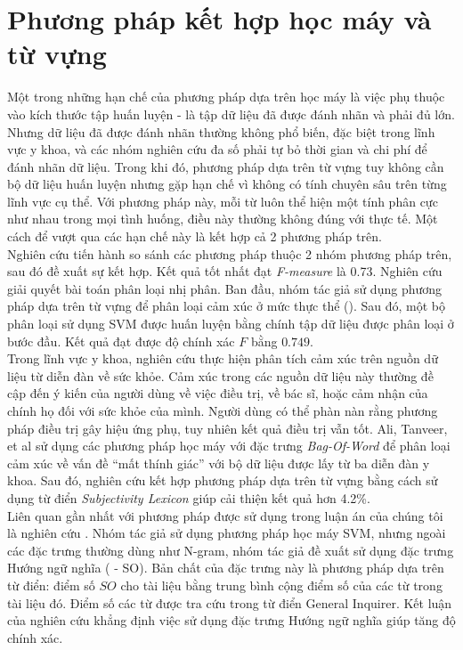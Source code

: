 \section{Phương pháp kết hợp học máy và từ vựng}
Một trong những hạn chế của phương pháp dựa trên học máy là việc phụ thuộc vào kích thước tập huấn luyện - là tập dữ liệu đã được đánh nhãn và phải đủ lớn. Nhưng dữ liệu đã được đánh nhãn thường không phổ biến, đặc biệt trong lĩnh vực y khoa, và các nhóm nghiên cứu đa số phải tự bỏ thời gian và chi phí để đánh nhãn dữ liệu. Trong khi đó, phương pháp dựa trên từ vựng tuy không cần bộ dữ liệu huấn luyện nhưng gặp hạn chế vì không có tính chuyên sâu trên từng lĩnh vực cụ thể. Với phương pháp này, mỗi từ luôn thể hiện một tính phân cực như nhau trong mọi tình huống, điều này thường không đúng với thực tế. Một cách để vượt qua các hạn chế này là kết hợp cả 2 phương pháp trên.\\

Nghiên cứu \cite{gonccalves2013comparing} tiến hành so sánh các phương pháp thuộc 2 nhóm phương pháp trên, sau đó đề xuất sự kết hợp. Kết quả tốt nhất đạt \textit{F-measure} là 0.73. Nghiên cứu \cite{Zhang2015} giải quyết bài toán phân loại nhị phân. Ban đầu, nhóm tác giả sử dụng phương pháp dựa trên từ vựng để phân loại cảm xúc ở mức thực thể (). Sau đó, một bộ phân loại sử dụng SVM được huấn luyện bằng chính tập dữ liệu được phân loại ở bước đầu. Kết quả đạt được độ chính xác $F$ bằng $0.749$.\\

Trong lĩnh vực y khoa, nghiên cứu \cite{ali2013can} thực hiện phân tích cảm xúc trên nguồn dữ liệu từ diễn đàn về sức khỏe. Cảm xúc trong các nguồn dữ liệu này thường đề cập đến ý kiến của người dùng về việc điều trị, về bác sĩ, hoặc cảm nhận của chính họ đối với sức khỏe của mình. Người dùng có thể phàn nàn rằng phương pháp điều trị gây hiệu ứng phụ, tuy nhiên kết quả điều trị vẫn tốt. Ali, Tanveer, et al \cite{ali2013can} sử dụng các phương pháp học máy với đặc trưng \textit{Bag-Of-Word} để phân loại cảm xúc về vấn đề ``mất thính giác'' với bộ dữ liệu được lấy từ ba diễn đàn y khoa\footnotemark. Sau đó, nghiên cứu kết hợp phương pháp dựa trên từ vựng bằng cách sử dụng từ điển \textit{Subjectivity Lexicon} giúp cải thiện kết quả hơn 4.2\%. \\

Liên quan gần nhất với phương pháp được sử dụng trong luận án của chúng tôi là nghiên cứu \cite{sarker2011outcome}. Nhóm tác giả sử dụng phương pháp học máy SVM, nhưng ngoài các đặc trưng thường dùng như N-gram, nhóm tác giả đề xuất sử dụng đặc trưng Hướng ngữ nghĩa ( - SO). Bản chất của đặc trưng này là phương pháp dựa trên từ điển: điểm số $SO$ cho tài liệu bằng trung bình cộng điểm số của các từ trong tài liệu đó. Điểm số các từ được tra cứu trong từ điển General Inquirer. Kết luận của nghiên cứu khẳng định việc sử dụng đặc trưng Hướng ngữ nghĩa giúp tăng độ chính xác.